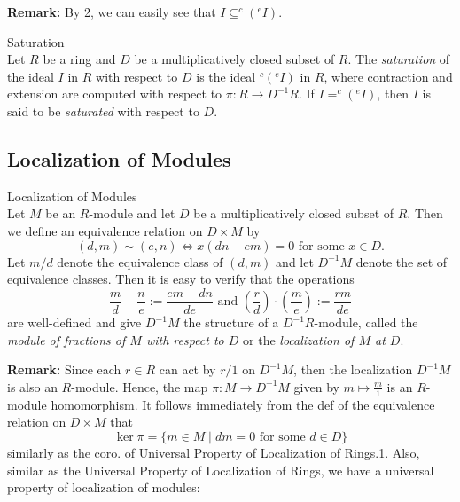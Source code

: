 \noindent\textbf{Remark:} By 2, we can easily see that $I \subseteq ^c(^eI)$.

\begin{definition}{Saturation}\\
Let $R$ be a ring and $D$ be a multiplicatively closed subset of $R$. The \textit{saturation} of the ideal $I$ in $R$ with respect to $D$ is the ideal $^c(^eI)$ in $R$, where contraction and extension are computed with respect to $\pi: R\to D^{-1}R$. If $I= ^c(^eI)$, then $I$ is said to be \textit{saturated} with respect to $D$.
\end{definition}

\subsection{Localization of Modules}

\begin{definition}{Localization of Modules}\\
Let $M$ be an $R$-module and let $D$ be a multiplicatively closed subset of $R$. Then we define an equivalence relation on $D\times M$ by
\[
(d,m) \sim (e,n) \Leftrightarrow x(dn-em)=0 \text{ for some } x\in D.
\]
Let $m/d$ denote the equivalence class of $(d,m)$ and let $D^{-1}M$ denote the set of equivalence classes. Then it is easy to verify that the operations
\[
\frac{m}{d} + \frac{n}{e} := \frac{em+dn}{de} \text{ and } (\frac{r}{d}) \cdot (\frac{m}{e}) := \frac{rm}{de}
\]
are well-defined and give $D^{-1}M$ the structure of a $D^{-1}R$-module, called the \textit{module of fractions of $M$ with respect to $D$} or the \textit{localization of $M$ at $D$}.
\end{definition}

\noindent\textbf{Remark:} Since each $r\in R$ can act by $r/1$ on $D^{-1}M$, then the localization $D^{-1}M$ is also an $R$-module. Hence, the map $\pi:M \to D^{-1}M$ given by $m \mapsto \frac{m}{1}$ is an $R$-module homomorphism. It follows immediately from the def of the equivalence relation on $D\times M$ that
$$\ker \pi= \{ m\in M \mid dm=0 \text{ for some } d\in D\}$$
similarly as the coro. of Universal Property of Localization of Rings.1. Also, similar as the Universal Property of Localization of Rings, we have a universal property of localization of modules:


